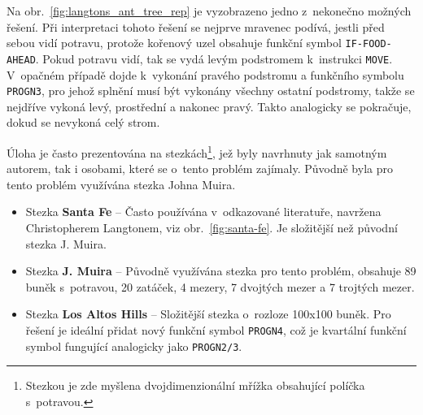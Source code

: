 Na obr.~\ref{fig:langtons_ant_tree_rep} je vyzobrazeno jedno z~nekonečno možných řešení. Při interpretaci tohoto řešení se nejprve mravenec podívá, jestli před sebou vidí potravu, protože kořenový uzel obsahuje funkční symbol \texttt{IF-FOOD-AHEAD}. Pokud potravu vidí, tak se vydá levým podstromem k~instrukci \texttt{MOVE}. V~opačném případě dojde k~vykonání pravého podstromu a funkčního symbolu \texttt{PROGN3}, pro jehož splnění musí být vykonány všechny ostatní podstromy, takže se nejdříve vykoná levý, prostřední a nakonec pravý. Takto analogicky se pokračuje, dokud se nevykoná celý strom.

Úloha je často prezentována na stezkách\footnote{Stezkou je zde myšlena dvojdimenzionální mřížka obsahující políčka s~potravou.}, jež byly navrhnuty jak samotným autorem, tak i osobami, které se o~tento problém zajímaly. Původně byla pro tento problém využívána stezka Johna Muira.

\begin{itemize}
    \item Stezka \textbf{Santa Fe} -- Často používána v~odkazované literatuře, navržena Christopherem Langtonem, viz obr.~\ref{fig:santa-fe}. Je složitější než původní stezka J. Muira.
    \item Stezka \textbf{J. Muira} -- Původně využívána stezka pro tento problém, obsahuje 89 buněk s~potravou, 20 zatáček, 4 mezery, 7 dvojtých mezer a 7 trojtých mezer. 
    \item Stezka \textbf{Los Altos Hills} -- Složitější stezka o~rozloze 100x100 buněk. Pro řešení je ideální přidat nový funkční symbol \texttt{PROGN4}, což je kvartální funkční symbol fungující analogicky jako \texttt{PROGN2/3}. 
\end{itemize}

